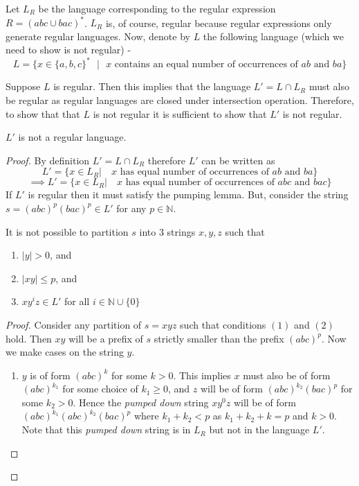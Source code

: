 \begin{soln}
Let $L_R$ be the language corresponding to the regular expression $R = (abc \cup bac)^*$. $L_R$ is, of course, regular because regular expressions only generate regular languages. Now, denote by $L$ the following language (which we need to show is not regular) -
\[
L = \{x\in\{a,b,c\}^*\text{ }|\text{ }x\text{ contains an equal number of occurrences of }ab\text{ and }ba\}
\]

Suppose $L$ is regular. Then this implies that the language $L' = L \cap L_R$ must also be regular as regular languages are closed under intersection operation. Therefore, to show that that $L$ is not regular it is sufficient to show that $L'$ is not regular.

\begin{claim}
$L'$ is not a regular language.
\end{claim}
\begin{proof}
By definition $L' = L \cap L_R$ therefore $L'$ can be written as
\[
    L' = \{ x \in L_R | \quad x \text{ has equal number of occurrences of }ab\text{ and }ba\}
\]
\[
    \implies L' = \{ x \in L_R | \quad x \text{ has equal number of occurrences of }abc\text{ and }bac\}
\]
If $L'$ is regular then it must satisfy the pumping lemma. But, consider the string $s = (abc)^p (bac)^p \in L'$ for any $p \in \mathbb{N}$.
\begin{claim}
    It is not possible to partition $s$ into 3 strings $x, y, z$ such that
    \begin{enumerate}
        \item $|y| > 0$, and
        \item $|xy| \leq p$, and
        \item $x y^i z \in L'$ for all $i \in \mathbb{N} \cup \{0\}$
    \end{enumerate}
\end{claim}
\begin{proof}
Consider any partition of $s = xyz$ such that conditions $(1)$ and $(2)$ hold. Then $xy$ will be a prefix of $s$ strictly smaller than the prefix $(abc)^p$. Now we make cases on the string $y$.
\begin{enumerate}
    \item $y$ is of form $(abc)^k$ for some $k > 0$. This implies $x$ must also be of form $(abc)^{k_1}$ for some choice of $k_1 \geq 0$, and $z$ will be of form $(abc)^{k_2} (bac)^p$ for some $k_2 > 0$. Hence the \emph{pumped down} string $x y^0 z$ will be of form $(abc)^{k_1} (abc)^{k_2} (bac)^p$ where $k_1 + k_2 < p$ as $k_1 + k_2 + k = p$ and $k > 0$. Note that this \emph{pumped down} string is in $L_R$ but not in the language $L'$.

\end{enumerate}
\end{proof}
\end{proof}
\end{soln}

